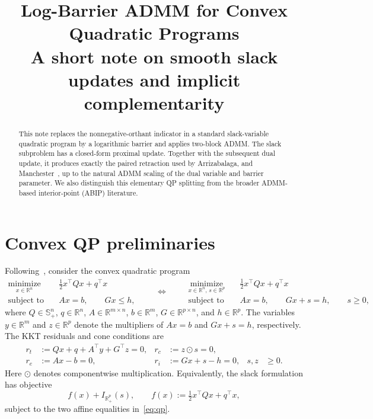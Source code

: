\documentclass[9pt]{extarticle}
\title{Log-Barrier ADMM for Convex Quadratic Programs\\
\large A short note on smooth slack updates and implicit complementarity}
\author{}
\date{}
\newcommand{\R}{\mathbb{R}}
\newcommand{\had}{\mathbin{\odot}}
\begin{document}
\maketitle
\vspace{-2.5em}

\begin{abstract}
This note replaces the nonnegative-orthant indicator in a standard slack-variable
quadratic program by a logarithmic barrier and applies two-block ADMM.  The slack
subproblem has a closed-form proximal update.  Together with the subsequent dual
update, it produces exactly the paired retraction used by Arrizabalaga, and
Manchester~\cite{arrizabalaga2026implicit,arrizabalaga2026}, up to the natural ADMM scaling of the dual
variable and barrier parameter.  We also distinguish this elementary QP splitting
from the broader ADMM-based interior-point (ABIP) literature.
\end{abstract}

\section{Convex QP preliminaries}

Following~\cite{arrizabalaga2026,arrizabalaga2026implicit}, consider the convex quadratic program
\begin{equation}
\begin{aligned}
  \underset{x\in\R^n}{\operatorname{minimize}}\quad
      & \tfrac12 x^\top Qx+q^\top x \\
  \operatorname{subject\ to}\quad
      & Ax=b, \qquad Gx\le h,
\end{aligned}
\qquad
\Longleftrightarrow
\qquad
\begin{aligned}
  \underset{x\in\R^n,\,s\in\R^p}{\operatorname{minimize}}\quad
      & \tfrac12 x^\top Qx+q^\top x \\
  \operatorname{subject\ to}\quad
      & Ax=b,\qquad Gx+s=h,\qquad s\ge0,
\end{aligned}
\label{eq:qp}
\end{equation}
where $Q\in\mathbb{S}_+^n$, $q\in\R^n$, $A\in\R^{m\times n}$,
$b\in\R^m$, $G\in\R^{p\times n}$, and $h\in\R^p$.  The variables
$y\in\R^m$ and $z\in\R^p$ denote the multipliers of $Ax=b$ and
$Gx+s=h$, respectively.  The KKT residuals and cone conditions are
\begin{align}
 r_t&:=Qx+q+A^\top y+G^\top z=0, &
 r_c&:=z\had s=0, \nonumber\\
 r_e&:=Ax-b=0, &
 r_i&:=Gx+s-h=0, & s,z&\ge0.                 \label{eq:kkt}
\end{align}
Here $\had$ denotes componentwise multiplication.  Equivalently, the slack
formulation has objective
\begin{equation}
  f(x)+I_{\R_+^p}(s),\qquad
  f(x):=\tfrac12x^\top Qx+q^\top x,
\end{equation}
subject to the two affine equalities in~\eqref{eq:qp}.
\end{document}
